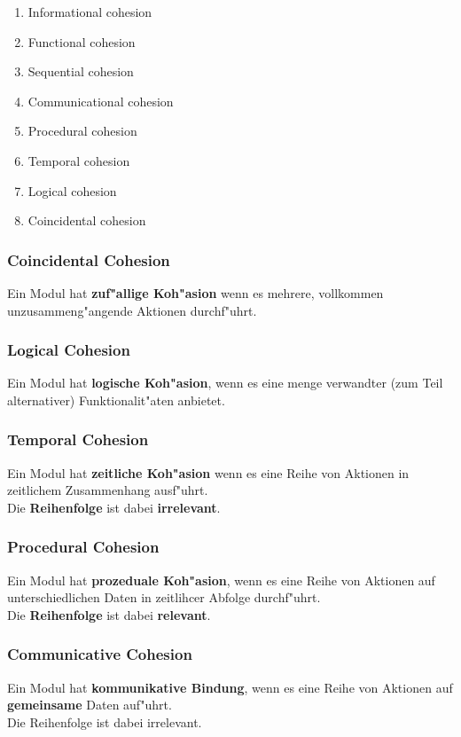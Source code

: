 \begin{enumerate}
    \item Informational cohesion
    \item Functional cohesion
    \item Sequential cohesion
    \item Communicational cohesion
    \item Procedural cohesion
    \item Temporal cohesion
    \item Logical cohesion
    \item Coincidental cohesion
\end{enumerate}

\subsubsection{Coincidental Cohesion}
Ein Modul hat \textbf{zuf"allige Koh"asion} wenn es mehrere, vollkommen unzusammeng"angende Aktionen durchf"uhrt.

\subsubsection{Logical Cohesion}
Ein Modul hat \textbf{logische Koh"asion}, wenn es eine menge verwandter (zum Teil alternativer) Funktionalit"aten anbietet.

\subsubsection{Temporal Cohesion}
Ein Modul hat \textbf{zeitliche Koh"asion} wenn es eine Reihe von Aktionen in zeitlichem Zusammenhang ausf"uhrt.\\
Die \textbf{Reihenfolge} ist dabei \textbf{irrelevant}.

\subsubsection{Procedural Cohesion}
Ein Modul hat \textbf{prozeduale Koh"asion}, wenn es eine Reihe von Aktionen auf unterschiedlichen Daten in zeitlihcer Abfolge durchf"uhrt.\\
Die \textbf{Reihenfolge} ist dabei \textbf{relevant}.

\subsubsection{Communicative Cohesion}
Ein Modul hat \textbf{kommunikative Bindung}, wenn es eine Reihe von Aktionen auf \textbf{gemeinsame} Daten auf"uhrt.\\
Die Reihenfolge ist dabei irrelevant.

